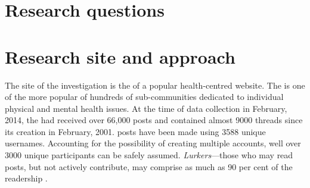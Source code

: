\section{Research questions}




\section{Research site and approach}

The site of the investigation is the   of a popular health\hyp{}centred website. The  is one of the more popular of hundreds of sub-communities dedicated to individual physical and mental health issues. At the time of data collection in February, 2014, the  had received over 66,000 \glspl{post} and contained almost 9000 \glspl{thread} since its creation in February, 2001. \Glspl{post} have been made using 3588 unique usernames. Accounting for the possibility of  creating multiple accounts, well over 3000 unique participants can be safely assumed. \emph{Lurkers}---those who may read \glspl{post}, but not actively contribute, may comprise as much as 90 per cent of the readership \cite{preece_top_2004}.

